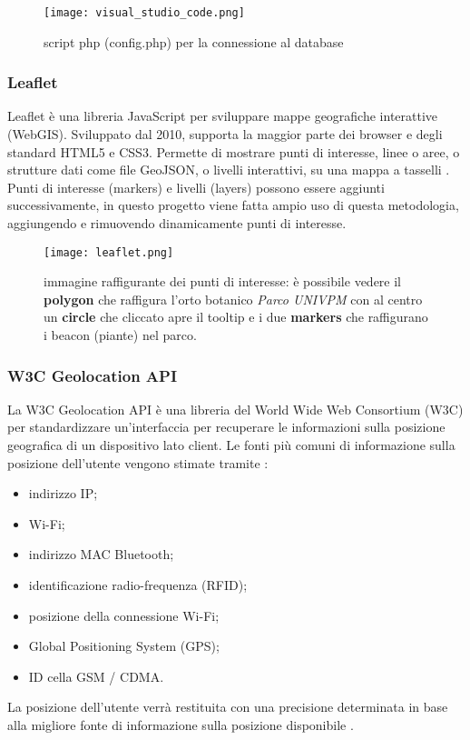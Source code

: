  \begin{figure}[H]
	\centering
	\caption{script php (config.php) per la connessione al database}
	\texttt{[image: visual\_studio\_code.png]}
\end{figure}

\subsubsection{Leaflet}
Leaflet è una libreria JavaScript per sviluppare mappe geografiche interattive (WebGIS). Sviluppato dal 2010, supporta la maggior parte dei browser e degli standard HTML5 e CSS3. Permette di mostrare punti di interesse, linee o aree, o strutture dati come file GeoJSON, o livelli interattivi, su una mappa a tasselli \cite{sito_leaflet}. \newline
Punti di interesse (markers) e livelli (layers) possono essere aggiunti successivamente, in questo progetto viene fatta ampio uso di questa metodologia, aggiungendo e rimuovendo dinamicamente punti di interesse.
\begin{figure}[h]
	\centering
	\caption{immagine raffigurante dei punti di interesse: è possibile vedere il \textbf{polygon} che raffigura l'orto botanico \textit{Parco UNIVPM} con al centro un \textbf{circle} che cliccato apre il tooltip e i due \textbf{markers} che raffigurano i beacon (piante) nel parco.}
	\texttt{[image: leaflet.png]}
\end{figure}

\subsubsection{W3C Geolocation API}
La W3C Geolocation API è una libreria del World Wide Web Consortium (W3C) per standardizzare un'interfaccia per recuperare le informazioni sulla posizione geografica di un dispositivo lato client. Le fonti più comuni di informazione sulla posizione dell'utente vengono stimate tramite :
\begin{itemize}
\item indirizzo IP;
\item Wi-Fi;
\item indirizzo MAC Bluetooth;
\item identificazione radio-frequenza (RFID);
\item posizione della connessione Wi-Fi;
\item Global Positioning System (GPS);
\item ID cella GSM / CDMA.
\end{itemize} 
La posizione dell'utente verrà restituita con una precisione determinata in base alla migliore fonte di informazione sulla posizione disponibile \cite{sito_geolocation_API}.

